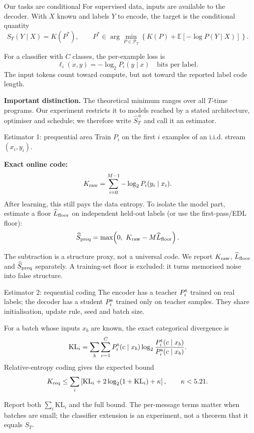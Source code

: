 \documentclass[aspectratio=43]{beamer}
\newcommand{\KL}{\mathrm{KL}}
\newcommand{\E}{\mathbb{E}}
\begin{document}
\begin{frame}{Our tasks are conditional}
For supervised data, inputs are available to the decoder. With $X$ known and labels $Y$ to encode,
the target is the conditional quantity
\[
 S_T(Y\mid X)=K(P^*),\qquad
 P^*\in\arg\min_{P\in\mathcal P_T}\left\{K(P)+\E[-\log P(Y\mid X)]\right\}.
\]

\medskip
For a classifier with $C$ classes, the per-example loss is
\[
 \ell_i(x,y)=-\log_2 P_i(y\mid x)\quad\text{bits per label}.
\]
The input tokens count toward compute, but not toward the reported label code length.

\medskip
\textbf{Important distinction.} The theoretical minimum ranges over all $T$-time programs.
Our experiment restricts it to models reached by a stated architecture, optimiser and schedule;
we therefore write $\widehat S^{\,a}_T$ and call it an estimator.
\end{frame}

\begin{frame}{Estimator 1: prequential area}
Train $P_i$ on the first $i$ examples of an i.i.d. stream $(x_i,y_i)$.

\medskip
\textbf{Exact online code:}
\[
 K_{\rm raw}=\sum_{i=0}^{M-1}-\log_2 P_i(y_i\mid x_i).
\]
After learning, this still pays the data entropy. To isolate the model part, estimate a floor
$\widehat L_{\rm floor}$ on independent held-out labels (or use the first-pass/EDL floor):
\[
 \widehat S_{\rm preq}=\max\!\left(0,\ K_{\rm raw}-M\widehat L_{\rm floor}\right).
\]

\medskip
The subtraction is a structure proxy, not a universal code. We report $K_{\rm raw}$,
$\widehat L_{\rm floor}$ and $\widehat S_{\rm preq}$ separately. A training-set floor is excluded:
it turns memorised noise into false structure.
\end{frame}

\begin{frame}{Estimator 2: requential coding}
The encoder has a teacher $P_i^{\rm t}$ trained on real labels; the decoder has a student
$P_i^{\rm s}$ trained only on teacher samples. They share initialisation, update rule, seed and batch size.

\medskip
For a batch whose inputs $x_b$ are known, the exact categorical divergence is
\[
 \KL_i=\sum_b\sum_{c=1}^{C}P_i^{\rm t}(c\mid x_b)
 \log_2\frac{P_i^{\rm t}(c\mid x_b)}{P_i^{\rm s}(c\mid x_b)}.
\]
Relative-entropy coding gives the expected bound
\[
 K_{\rm req}\le\sum_i\left[\KL_i+2\log_2(1+\KL_i)+\kappa\right],
 \qquad \kappa<5.21.
\]
\citep{qiu2026}

\medskip
Report both $\sum_i\KL_i$ and the full bound. The per-message terms matter when batches are small;
the classifier extension is an experiment, not a theorem that it equals $S_T$.
\end{frame}
\end{document}
